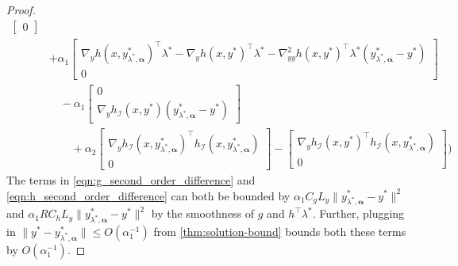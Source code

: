 \begin{proof}
\begin{align}
\begin{bmatrix}
        0
        \end{bmatrix}\label{eqn:g_second_order_difference} \\
     & +
    \alpha_1 \begin{bmatrix}
        \nabla_y h(x,y_{\lambda^*,\boldsymbol{\alpha}}^*)^\top \lambda^* - \nabla_y h(x,y^*)^\top \lambda^* - \nabla^2_{yy} h(x,y^*)^\top \lambda^* (y_{\lambda^*,\boldsymbol{\alpha}}^* - y^*) \\
        0
    \end{bmatrix}\label{eqn:h_second_order_difference}
    \\
    & \quad -
    \alpha_1 \begin{bmatrix}
        0 \\ 
        \nabla_y h_\mathcal{I}(x,y^*) (y_{\lambda^*,\boldsymbol{\alpha}}^* - y^*)
    \end{bmatrix} \label{eqn:constraint_difference}
    \\
    & \quad \quad + \alpha_2  \begin{bmatrix}
        \nabla_y h_\mathcal{I}(x,y_{\lambda^*,\boldsymbol{\alpha}}^*)^\top h_\mathcal{I}(x,y_{\lambda^*,\boldsymbol{\alpha}}^*)  \\
        0 
    \end{bmatrix} - \begin{bmatrix}
        \nabla_y h_\mathcal{I}(x,y^*)^\top h_\mathcal{I}(x,y_{\lambda^*,\boldsymbol{\alpha}}^*) \\
        0
    \end{bmatrix} \biggr)
    \label{eqn:h2-difference}
\end{align}
The terms in \cref{eqn:g_second_order_difference} and \cref{eqn:h_second_order_difference} can both be bounded by $\alpha_1 C_{g} L_y \|y_{\lambda^*,\boldsymbol{\alpha}}^* - y^*\|^2$ and $\alpha_1 R C_{h} L_y \|y_{\lambda^*,\boldsymbol{\alpha}}^* - y^*\|^2$ by the smoothness of $g$ and $h^\top \lambda^*$. Further, plugging in   $\|y^*- y_{\lambda^*,\boldsymbol{\alpha}}^*\| \leq O({\alpha_1^{-1}})$ from \cref{thm:solution-bound} bounds both these terms by $O({\alpha_1^{-1}})$. 



\end{proof}
